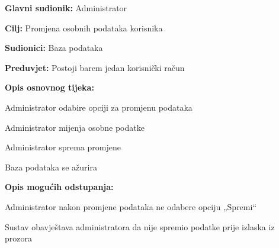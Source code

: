 					\noindent {}
					\begin{packed_item}
	
						\item \textbf{Glavni sudionik: }  Administrator
						\item  \textbf{Cilj:} Promjena osobnih podataka korisnika
						\item  \textbf{Sudionici:} Baza podataka
						\item  \textbf{Preduvjet:} Postoji barem jedan korisnički račun
						\item  \textbf{Opis osnovnog tijeka:} 
						
						
						\item[] \begin{packed_enum}
	
							\item Administrator odabire opciji za promjenu podataka				
							\item Administrator mijenja osobne podatke
							\item Administrator sprema promjene
							\item Baza podataka se ažurira
							
						\end{packed_enum}
						
						\item  \textbf{Opis mogućih odstupanja:}
						
						\item[] \begin{packed_item}
	
							\item[1.a] Administrator nakon promjene podataka ne odabere opciju 
							„Spremi“
							
							
							\item[] \begin{packed_enum}
								
								\item Sustav obavještava administratora da nije spremio podatke 
								prije izlaska iz prozora
								
							\end{packed_enum}
							
						\end{packed_item}
					\end{packed_item}
